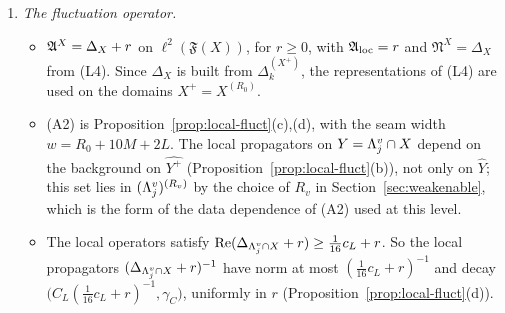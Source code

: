 \begin{enumerate}[label=(L\arabic*)]
  In the repetition of (L3) the potential $W_2^X(s)$ is put into the non-local part $\mathfrak N$, with $X_i=Y_i=1$, not into $\fA_{\rm loc}$. It depends on $X$ globally, through $\omega^X_0$, so it does not satisfy the requirement of (A1) on local parts. Its plain norm and its compatibility follow from (L3), (L4) with $W=0$ and Theorem~\ref{thm:weak-inverse}(b). In this repetition the local propagators are the inverses of the Dirichlet operators with the potential $W_2^{X_j}$, $X_j=\Lam^v_j\cap X$, which depends on $U$ on all of $\hat X_j$. So (A2) is not Theorems~\ref{thm:reg-gauge}(a) and~\ref{thm:reg-locality}(a) literally. Existence, $\Rea$-coercivity and decay come from Proposition~\ref{prop:reg-complex}, whose hypotheses $W_2^{X_j}$ satisfies (Proposition~\ref{prop:dirichlet-hessian}(b),(c)); the comparison of domains comes from Propositions~\ref{prop:dirichlet-averaged}(d), which allows different potentials on the two domains, and~\ref{prop:dirichlet-hessian}(d), as stated in Section~\ref{sec:reg-gauge}. These comparisons include $P\in\{D,D^T,\nabla\}$, so the comparison of the local commutators in Theorem~\ref{thm:weak-inverse}(b) follows as at the first pass of (L3); the local part is the same. Repeating (L3) and (L4) with the potential $W_2^X$ gives $\boldsymbol\Gamma^X[W_2^X](s)$ and the Dirichlet Hessians $\Delta^{0,X}(s)$. Through the local maps $\hat Z^1$, $\hat Z^2$ it gives the operators $\Delta^{(X)}_k(s)$ and $\Delta_Y(s)$ of Section~\ref{sec:localization}.
\item \emph{The fluctuation operator.}
  \begin{itemize}
  \item $\mathfrak A^X=\Delta_X+r$ on $\ell^2(\mathfrak F(X))$, for $r\ge0$, with $\mathfrak A_{\rm loc}=r$ and $\mathfrak N^X=\Delta_X$ from (L4). Since $\Delta_X$ is built from $\Delta^{(X^+)}_k$, the representations of (L4) are used on the domains $X^+=X^{(R_0)}$.
  \item (A2) is Proposition~\ref{prop:local-fluct}(c),(d), with the seam width $w=R_0+10M+2L$. The local propagators on $Y=\Lambda^v_j\cap X$ depend on the background on $\widehat{Y^+}$ (Proposition~\ref{prop:local-fluct}(b)), not only on $\hat Y$; this set lies in $(\Lambda^v_j)^{(R_v)}$ by the choice of $R_v$ in Section~\ref{sec:weakenable}, which is the form of the data dependence of (A2) used at this level.
  \item The local operators satisfy $\operatorname{Re}(\Delta_{\Lambda^v_j\cap X}+r)\ge\frac1{16}c_L+r$. So the local propagators $(\Delta_{\Lambda^v_j\cap X}+r)^{-1}$ have norm at most $(\frac1{16}c_L+r)^{-1}$ and decay $\big(C_L(\frac1{16}c_L+r)^{-1},\gamma_C\big)$, uniformly in $r$ (Proposition~\ref{prop:local-fluct}(d)).

\end{itemize}
\end{enumerate}
